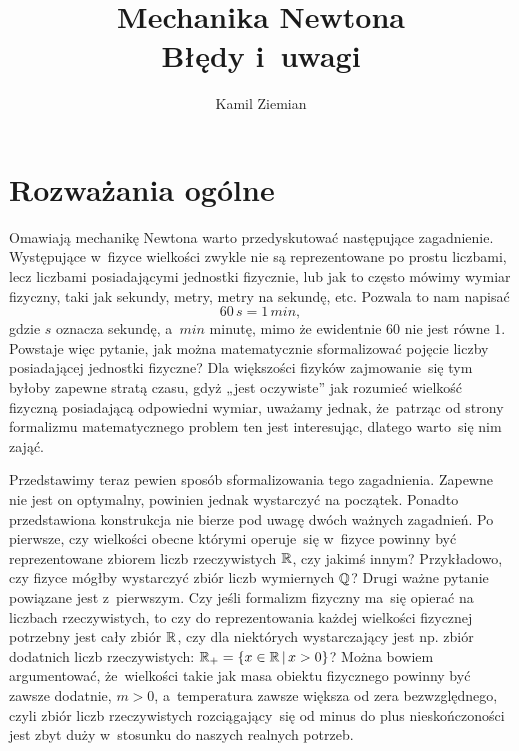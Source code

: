 \documentclass[a4paper,11pt]{article}
\title{Mechanika Newtona \\
  {\Large Błędy i~uwagi}}
\author{Kamil Ziemian}
\numberwithin{equation}{section}
\begin{document}





\maketitle %





\section{Rozważania ogólne}

\vspace{\spaceTwo}



Omawiają mechanikę Newtona warto przedyskutować następujące zagadnienie.
Występujące w~fizyce wielkości zwykle nie są reprezentowane po prostu
liczbami, lecz liczbami posiadającymi jednostki fizycznie, lub jak to
często mówimy wymiar fizyczny, taki jak sekundy, metry, metry na sekundę,
etc. Pozwala to nam napisać
\begin{equation}
  \label{eq:Mechanika-Rozwazania-ogolne-01}
  60 \, \si{s} = 1 \, \si{min},
\end{equation}
gdzie $\si{s}$ oznacza sekundę, a~$\si{min}$ minutę, mimo że ewidentnie
$60$ nie jest równe $1$. Powstaje więc pytanie, jak można matematycznie
sformalizować pojęcie liczby posiadającej jednostki fizyczne? Dla większości
fizyków zajmowanie~się tym byłoby zapewne stratą czasu, gdyż „jest
oczywiste” jak rozumieć wielkość fizyczną posiadającą odpowiedni wymiar,
uważamy jednak, że~patrząc od strony formalizmu matematycznego problem
ten jest interesując, dlatego warto~się nim zająć.

Przedstawimy teraz pewien sposób sformalizowania tego zagadnienia. Zapewne
nie jest on optymalny, powinien jednak wystarczyć na początek. Ponadto
przedstawiona konstrukcja nie bierze pod uwagę dwóch ważnych zagadnień. Po
pierwsze, czy wielkości obecne którymi operuje~się w~fizyce powinny być
reprezentowane zbiorem liczb rzeczywistych $\mathbb{R}$, czy jakimś innym?
Przykładowo, czy fizyce mógłby wystarczyć zbiór liczb wymiernych $\mathbb{Q}$?
Drugi ważne pytanie powiązane jest z~pierwszym. Czy jeśli formalizm fizyczny
ma~się opierać na liczbach rzeczywistych, to czy do reprezentowania każdej
wielkości fizycznej potrzebny jest cały zbiór $\mathbb{R}$, czy dla niektórych
wystarczający jest np. zbiór dodatnich liczb rzeczywistych:
$\mathbb{R}_{ + } = \{ x \in \mathbb{R} \, | \, x > 0 \}$? Można bowiem argumentować,
że~wielkości takie jak masa obiektu fizycznego powinny być zawsze dodatnie,
$m > 0$, a~temperatura zawsze większa od zera bezwzględnego, czyli zbiór
liczb rzeczywistych rozciągający~się od minus do plus nieskończoności jest
zbyt duży w~stosunku do naszych realnych potrzeb.
\end{document}
